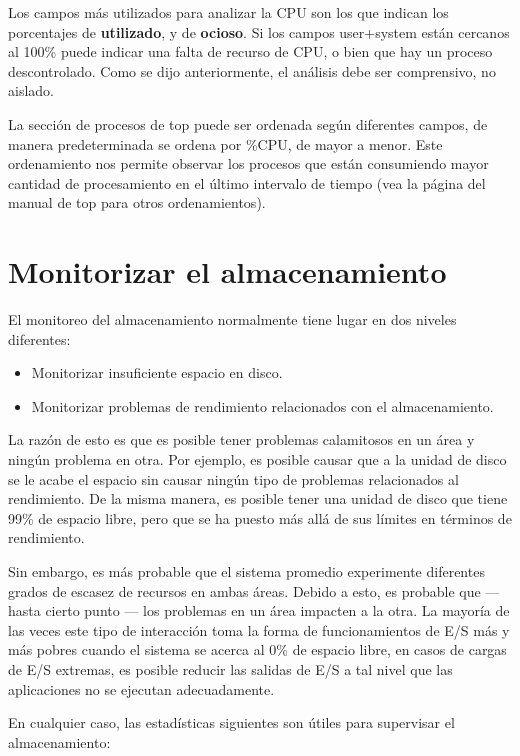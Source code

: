 \documentclass[12pt]{article}
\begin{document}
Los campos más utilizados para analizar la CPU son los que indican los 
porcentajes de \textbf{utilizado}, y de \textbf{ocioso}. Si los campos 
user+system están cercanos al 100\% puede indicar una falta de recurso de 
CPU, o bien que hay un proceso descontrolado. Como se dijo anteriormente, 
el análisis debe ser comprensivo, no aislado. 

La sección de procesos de top puede ser ordenada según diferentes campos, 
de manera predeterminada se ordena por \%CPU, de mayor a menor. Este 
ordenamiento nos permite observar los procesos que están consumiendo mayor
cantidad de procesamiento en el último intervalo de tiempo (vea la página
del manual de top para otros ordenamientos). 

\section*{Monitorizar el almacenamiento}
El monitoreo del almacenamiento normalmente tiene lugar en dos niveles 
diferentes:

\begin{itemize}
\item Monitorizar insuficiente espacio en disco.
\item Monitorizar problemas de rendimiento relacionados con el 
almacenamiento.
\end{itemize}

La razón de esto es que es posible tener problemas calamitosos en un área 
y ningún problema en otra. Por ejemplo, es posible causar que a la unidad 
de disco se le acabe el espacio sin causar ningún tipo de problemas 
relacionados al rendimiento. De la misma manera, es posible tener una 
unidad de disco que tiene 99\% de espacio libre, pero que se ha puesto más 
allá de sus límites en términos de rendimiento.

Sin embargo, es más probable que el sistema promedio experimente diferentes
 grados de escasez de recursos en ambas áreas. Debido a esto, es probable
 que — hasta cierto punto — los problemas en un área impacten a la otra. 
La mayoría de las veces este tipo de interacción toma la forma de 
funcionamientos de E/S más y más pobres cuando el sistema se acerca al
 0\% de espacio libre, en casos de cargas de E/S extremas, es posible 
reducir las salidas de E/S a tal nivel que las aplicaciones no se ejecutan 
adecuadamente.

En cualquier caso, las estadísticas siguientes son útiles para supervisar 
el almacenamiento:
\end{document}
